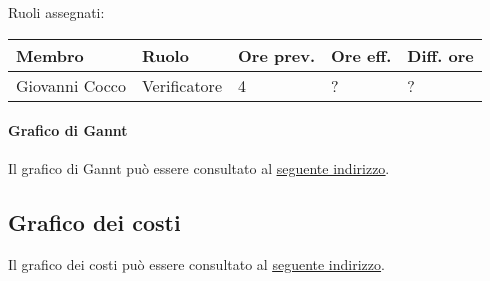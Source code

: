 \documentclass[a4paper, 12pt]{article}
\begin{document}
Ruoli assegnati:\\[0.5em]
\begin{tabular}{|l|l|l|l|l|}\hline
Membro & Ruolo & Ore prev. & Ore eff. & Diff. ore \\\hline
Giovanni Cocco & Verificatore & 4 & ? & ? \\\hline
\end{tabular}

\paragraph{Grafico di Gannt}
Il grafico di Gannt può essere consultato al \underline{\href{https://docs.google.com/spreadsheets/d/e/2PACX-1vRd4970Fob6KlNwY1iV6bnHZXNl41F74utFkkc9ykuT1NUEGLnFcCd4rOHbXjW99ichDnkV3cEGCmWi/pubhtml?gid=1972921762}{seguente indirizzo}}.


\subsection{Grafico dei costi}
Il grafico dei costi può essere consultato al \underline{\href{https://docs.google.com/spreadsheets/d/e/2PACX-1vRd4970Fob6KlNwY1iV6bnHZXNl41F74utFkkc9ykuT1NUEGLnFcCd4rOHbXjW99ichDnkV3cEGCmWi/pubhtml?gid=263680959}{seguente indirizzo}}.
\end{document}
